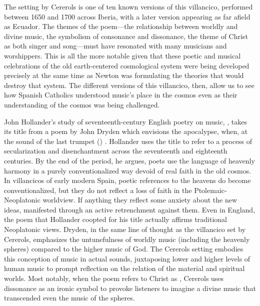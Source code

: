 
The setting by Cererols is one of ten known versions of this villancico,
performed between 1650 and 1700 across Iberia, with a later version appearing as
far afield as Ecuador.
The themes of the poem---the relationship between worldly and divine music, the
symbolism of consonance and dissonance, the theme of Christ as both singer and
song---must have resonated with many musicians and worshippers.
This is all the more notable given that these poetic and musical celebrations of
the old earth-centered cosmological system were being developed precisely at the
same time as Newton was formulating the theories that would destroy that system.
The different versions of this villancico, then, allow us to see how Spanish
Catholics understood music's place in the cosmos even as their understanding of
the cosmos was being challenged.


John Hollander's study of seventeenth-century English poetry on music,
, takes its title from a poem by John Dryden
which envisions the apocalypse, when, at the sound of the last trumpet
() .%
    \Autocites
    {Dryden:Alexander}
    {Hollander:Untuning}
Hollander uses the title to refer to a process of secularization and
disenchantment across the seventeenth and eighteenth centuries.
By the end of the period, he argues, poets use the language of heavenly harmony
in a purely conventionalized way devoid of real faith in the old cosmos.
In villancicos of early modern Spain, poetic references to the heavens do
become conventionalized, but they do not reflect a loss of faith in the
Ptolemaic-Neoplatonic worldview.
If anything they reflect some anxiety about the new ideas, manifested through
an active retrenchment against them.
Even in England, the poem that Hollander coopted for his title actually affirms
traditional Neoplatonic views.
Dryden, in the same line of thought as the villancico set by Cererols,
emphasizes the untunefulness of worldly music (including the heavenly spheres)
compared to the higher music of God.
The Cererols setting embodies this conception of music in actual sounds,
juxtaposing lower and higher levels of human music to prompt reflection on the
relation of the material and spiritual worlds.
Most notably, when the poem refers to Christ as ,
Cererols uses dissonance as an ironic symbol to provoke listeners to imagine a
divine music that transcended even the music of the spheres.

